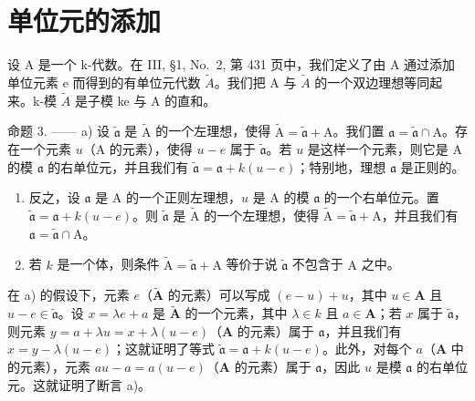 \section{单位元的添加}

设 A 是一个 k-代数。在 III, §1, No.~2, 第 431 页中，我们定义了由 A 通过添加单位元素 e 而得到的有单位元代数 \(\widetilde{A}\)。我们把 A 与 \(\widetilde{A}\) 的一个双边理想等同起来。k-模 \(\widetilde{A}\) 是子模 ke 与 A 的直和。

命题 3. —— a) 设 \(\widetilde{\mathfrak{a}}\) 是 \(\widetilde{\mathrm{A}}\) 的一个左理想，使得 \(\widetilde{\mathrm{A}} = \widetilde{\mathfrak{a}} + \mathrm{A}\)。我们置 \(\mathfrak{a} = \widetilde{\mathfrak{a}} \cap \mathrm{A}\)。存在一个元素 \(u\)（\(\mathrm{A}\) 的元素），使得 \(u - e\) 属于 \(\widetilde{\mathfrak{a}}\)。若 \(u\) 是这样一个元素，则它是 \(\mathrm{A}\) 的模 \(\mathfrak{a}\) 的右单位元，并且我们有 \(\widetilde{\mathfrak{a}} = \mathfrak{a} + k(u - e)\)；特别地，理想 \(\mathfrak{a}\) 是正则的。

\begin{enumerate}
\def\labelenumi{\alph{enumi})}
\setcounter{enumi}{1}
\item
  反之，设 \(\mathfrak{a}\) 是 A 的一个正则左理想，\(u\) 是 A 的模 \(\mathfrak{a}\) 的一个右单位元。置 \(\widetilde{\mathfrak{a}} = \mathfrak{a} + k(u - e)\)。则 \(\widetilde{\mathfrak{a}}\) 是 \(\widetilde{\mathrm{A}}\) 的一个左理想，使得 \(\widetilde{\mathrm{A}} = \widetilde{\mathfrak{a}} + \mathrm{A}\)，并且我们有 \(\mathfrak{a} = \widetilde{\mathfrak{a}} \cap \mathrm{A}\)。
\item
  若 \(k\) 是一个体，则条件 \(\widetilde{\mathrm{A}} = \widetilde{\mathfrak{a}} + \mathrm{A}\) 等价于说 \(\widetilde{\mathfrak{a}}\) 不包含于 \(\mathrm{A}\) 之中。
\end{enumerate}

在 a) 的假设下，元素 \(e\)（\(\widetilde{\mathbf{A}}\) 的元素）可以写成 \((e - u) + u\)，其中 \(u \in \mathbf{A}\) 且 \(u - e \in \widetilde{\mathfrak{a}}\)。设 \(x = \lambda e + a\) 是 \(\widetilde{\mathbf{A}}\) 的一个元素，其中 \(\lambda \in k\) 且 \(a \in \mathbf{A}\)；若 \(x\) 属于 \(\widetilde{\mathfrak{a}}\)，则元素 \(y = a + \lambda u = x + \lambda (u - e)\)（\(\mathbf{A}\) 的元素）属于 \(\mathfrak{a}\)，并且我们有 \(x = y - \lambda (u - e)\)；这就证明了等式 \(\widetilde{\mathfrak{a}} = \mathfrak{a} + k(u - e)\)。此外，对每个 \(a\)（\(\mathbf{A}\) 中的元素），元素 \(au - a = a(u - e)\)（\(\mathbf{A}\) 的元素）属于 \(\mathfrak{a}\)，因此 \(u\) 是模 \(\mathfrak{a}\) 的右单位元。这就证明了断言 a)。

